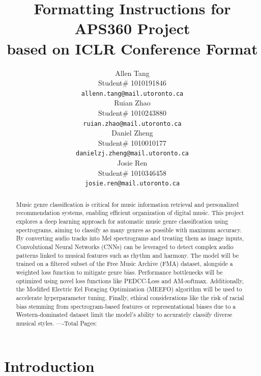 \documentclass{article} %
\title{Formatting Instructions for APS360 Project  \\ 
based on ICLR Conference Format}
\author{Allen Tang\\
Student\# 1010191846\\
\texttt{allenn.tang@mail.utoronto.ca} \\
\And
Ruian Zhao  \\
Student\# 1010243880 \\
\texttt{ruian.zhao@mail.utoronto.ca} \\
\AND
Daniel Zheng  \\
Student\# 1010010177 \\
\texttt{danielzj.zheng@mail.utoronto.ca} \\
\And
Josie Ren \\
Student\# 1010346458 \\
\texttt{josie.ren@mail.utoronto.ca} \\
\AND
}
\begin{document}
\maketitle

\begin{abstract}
Music genre classification is critical for music information retrieval and personalized recommendation systems, enabling efficient organization of digital music. This project explores a deep learning approach for automatic music genre classification using spectrograms, aiming to classify as many genres as possible with maximum accuracy. By converting audio tracks into Mel spectrograms and treating them as image inputs, Convolutional Neural Networks (CNNs) can be leveraged to detect complex audio patterns linked to musical features such as rhythm and harmony. The model will be trained on a filtered subset of the Free Music Archive (FMA) dataset, alongside a weighted loss function to mitigate genre bias. Performance bottlenecks will be optimized using novel loss functions like PEDCC-Loss and AM-softmax. Additionally, the Modified Electric Eel Foraging Optimization (MEEFO) algorithm will be used to accelerate hyperparameter tuning. Finally, ethical considerations like the risk of racial bias stemming from spectrogram-based features or representational biases due to a Western-dominated dataset limit the model’s ability to accurately classify diverse musical styles.
----Total Pages: \pageref{last_page}
\end{abstract}



\section{Introduction}
\end{document}
